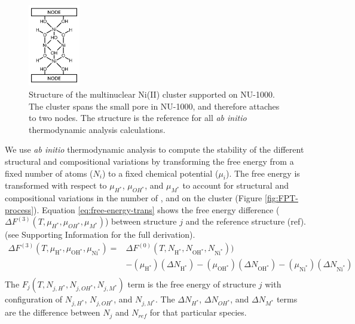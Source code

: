 \documentclass[journal=jctcce,manuscript=article]{achemso}
\begin{document}
\begin{figure}
    \centering
    \includegraphics[width=0.20\textwidth]{zi-images/00-General-Graphics/Reference-structure.png}
    \caption{Structure of the multinuclear Ni(II) cluster supported on NU-1000. The cluster spans the small pore in NU-1000, and therefore attaches to two nodes. The structure is the reference for all \textit{ab initio} thermodynamic analysis calculations.}
    \label{fig:ref_Ni4_structure}
\end{figure}

We use \textit{ab initio} thermodynamic analysis to compute the stability of the different structural and compositional variations by transforming the free energy from a fixed number of atoms ($N_i$) to a fixed chemical potential ($\mu_i$). The free energy is transformed with respect to $\mu_{H^{*}}$, $\mu_{OH^{*}}$, and $\mu_{M^{*}}$ to account for structural and compositional variations in the number of ,  and  on the cluster (Figure \ref{fig:FPT-process}). Equation \ref{eq:free-energy-trans} shows the free energy difference ($\Delta F^{(3)}(T,\mu_{H^{*}},\mu_{OH^{*}},\mu_{M^{*}})$) between structure $j$ and the reference structure (ref).  (see Supporting Information for the full derivation).
\begin{equation}
    \begin{split}
        \Delta F^{(3)}(T,\mu_{\text{H}^{*}},\mu_{\text{OH}^{*}},\mu_{\text{Ni}^{*}})  = 
            & \Delta F^{(0)}(T,N_{\text{H}^{*}},N_{\text{OH}^{*}},N_{\text{Ni}^{*}})) \\
            & - (\mu_{\text{H}^{*}})(\Delta N_{\text{H}^{*}}) - (\mu_{\text{OH}^{*}})(\Delta N_{\text{OH}^{*}}) - (\mu_{\text{Ni}^{*}})(\Delta N_{\text{Ni}^{*}}) \\ 
    \end{split}
    \label{eq:free-energy-trans}
\end{equation}
The $F_{j}(T,N_{j,H^{*}},N_{j,OH^{*}},N_{j,M^{*}})$ term is the free energy of structure $j$ with configuration of $N_{j,H^{*}}$, $N_{j,OH^{*}}$, and $N_{j,M^{*}}$. The $\Delta N_{H^{*}}$, $\Delta N_{OH^{*}}$, and $\Delta N_{M^{*}}$ terms are the difference between $N_{j}$ and $N_{ref}$ for that particular species. 
\end{document}
